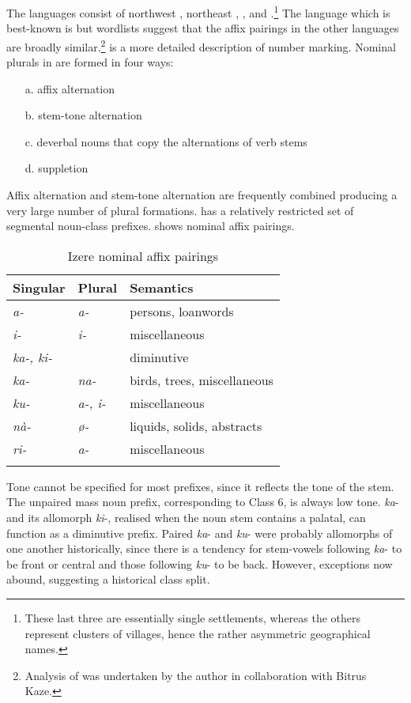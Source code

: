 \documentclass[output=paper]{langsci/langscibook}
\begin{document}
The  languages consist of northwest , northeast , ,  and .\footnote{These last three are essentially single settlements, whereas the others represent clusters of villages, hence the rather asymmetric geographical names.} The language which is best-known is  but wordlists suggest that the affix pairings in the other languages are broadly similar.\footnote{Analysis of  was undertaken by the author in collaboration with Bitrus Kaze.} \citet{Blench2000b} is a more detailed description of  number marking. Nominal plurals in  are formed in four ways:

 
\begin{itemize}
 \item[a.]  affix alternation
 \item[b.]  stem-tone alternation
 \item[c.]  deverbal nouns that copy the alternations of verb stems
 \item[d.]  suppletion
\end{itemize}

Affix alternation and stem-tone alternation are frequently combined producing a very large number of plural formations.  has a relatively restricted set of segmental noun-class prefixes.  shows  nominal affix pairings.

\begin{table}
\caption{\label{tab:nomaffplat:7} Izere nominal affix pairings}
\begin{tabularx}{\textwidth}{XXl}
\lsptoprule
  Singular 	&   Plural 	&   Semantics\\
  \midrule
\itshape a- 	& \itshape a- 	& persons, loanwords\\
\itshape i- 	& \itshape i- 	& miscellaneous\\
\itshape ka-, ki- 	&  	& diminutive\\
\itshape ka- 	& \itshape na- 	& birds, trees, miscellaneous\\
\itshape ku- 	& \itshape a-, i- 	& miscellaneous\\
\itshape nà- 	& \itshape ø- 	& liquids, solids, abstracts\\
\itshape ri- 	& \itshape a- 	& miscellaneous\\
\lspbottomrule
\end{tabularx} 
\end{table}

Tone cannot be specified for most  prefixes, since it reflects the tone of the stem. The unpaired mass noun prefix, corresponding to  Class 6, is always low tone. \textit{ka}- and its allomorph \textit{ki}-, realised when the noun stem contains a palatal, can function as a diminutive prefix. Paired \textit{ka}- and \textit{ku}- were probably allomorphs of one another historically, since there is a tendency for stem-vowels following \textit{ka}- to be front or central and those following \textit{ku}- to be back. However, exceptions now abound, suggesting a historical class split. 
\end{document}
